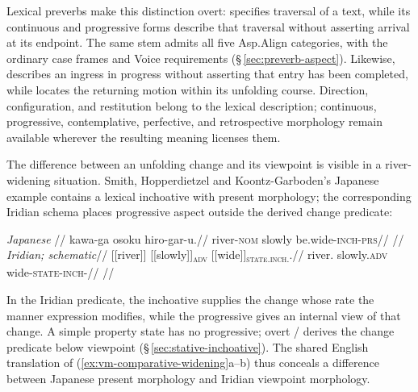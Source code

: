 Lexical preverbs make this distinction overt:   specifies traversal of a text, while its continuous and progressive
forms describe that traversal without asserting arrival at its endpoint.
The same stem admits all five Asp.Align categories, with the ordinary case
frames and Voice requirements (§\,\ref{sec:preverb-aspect}). Likewise,
  describes an ingress
in progress without asserting that entry has been completed, while
  locates the returning motion
within its unfolding course. Direction, configuration, and restitution belong
to the lexical description; continuous, progressive, contemplative, perfective,
and retrospective morphology remain available wherever the resulting meaning
licenses them.

The difference between an unfolding change and its viewpoint is visible in
a river-widening situation. Smith, Hopperdietzel and Koontz-Garboden's
Japanese example contains a lexical inchoative with present morphology;
the corresponding Iridian schema places progressive aspect outside the
derived change predicate:

\pex\label{ex:vm-comparative-widening}
\a
\begingl
\glpreamble \textit{Japanese} \cite[example~9b, p.~332]{smithhopperdietzelkoontzgarboden2025}//
\gla kawa-ga osoku hiro-gar-u.//
\glb river-\textsc{nom} slowly be.wide-\textsc{inch}-\textsc{prs}//
\glft {}//
\endgl
\a
\begingl
\glpreamble \textit{Iridian; schematic}//
\gla \textnormal{[[river]]}\textsubscript{\Dir{}} \textnormal{[[slowly]]}\textsubscript{\textsc{adv}} \textnormal{[[wide]]}\textsubscript{\textsc{state.inch}.\Prog{}}.//
\glb river.\Dir{} slowly.\textsc{adv} wide-\textsc{state}-\textsc{inch}-\Prog{}//
\glft {}
//
\endgl
\xe

In the Iridian predicate, the inchoative supplies the change whose rate the
manner expression modifies, while the progressive gives an internal view of
that change. A simple property state has no progressive; overt
/ derives the change predicate below viewpoint
(§\,\ref{sec:stative-inchoative}). The shared English translation of
(\ref{ex:vm-comparative-widening}a--b) thus conceals a difference between
Japanese present morphology and Iridian viewpoint morphology.


